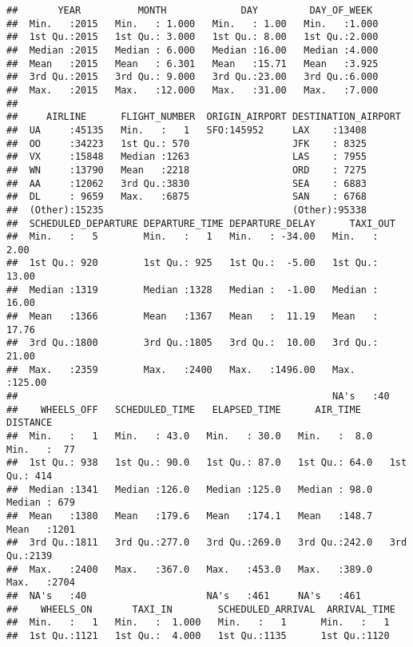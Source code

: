 \documentclass[
]{article}
\begin{document}
\begin{verbatim}
##       YEAR          MONTH             DAY         DAY_OF_WEEK   
##  Min.   :2015   Min.   : 1.000   Min.   : 1.00   Min.   :1.000  
##  1st Qu.:2015   1st Qu.: 3.000   1st Qu.: 8.00   1st Qu.:2.000  
##  Median :2015   Median : 6.000   Median :16.00   Median :4.000  
##  Mean   :2015   Mean   : 6.301   Mean   :15.71   Mean   :3.925  
##  3rd Qu.:2015   3rd Qu.: 9.000   3rd Qu.:23.00   3rd Qu.:6.000  
##  Max.   :2015   Max.   :12.000   Max.   :31.00   Max.   :7.000  
##                                                                 
##     AIRLINE      FLIGHT_NUMBER  ORIGIN_AIRPORT DESTINATION_AIRPORT
##  UA     :45135   Min.   :   1   SFO:145952     LAX    :13408      
##  OO     :34223   1st Qu.: 570                  JFK    : 8325      
##  VX     :15848   Median :1263                  LAS    : 7955      
##  WN     :13790   Mean   :2218                  ORD    : 7275      
##  AA     :12062   3rd Qu.:3830                  SEA    : 6883      
##  DL     : 9659   Max.   :6875                  SAN    : 6768      
##  (Other):15235                                 (Other):95338      
##  SCHEDULED_DEPARTURE DEPARTURE_TIME DEPARTURE_DELAY      TAXI_OUT     
##  Min.   :   5        Min.   :   1   Min.   : -34.00   Min.   :  2.00  
##  1st Qu.: 920        1st Qu.: 925   1st Qu.:  -5.00   1st Qu.: 13.00  
##  Median :1319        Median :1328   Median :  -1.00   Median : 16.00  
##  Mean   :1366        Mean   :1367   Mean   :  11.19   Mean   : 17.76  
##  3rd Qu.:1800        3rd Qu.:1805   3rd Qu.:  10.00   3rd Qu.: 21.00  
##  Max.   :2359        Max.   :2400   Max.   :1496.00   Max.   :125.00  
##                                                       NA's   :40      
##    WHEELS_OFF   SCHEDULED_TIME   ELAPSED_TIME      AIR_TIME        DISTANCE   
##  Min.   :   1   Min.   : 43.0   Min.   : 30.0   Min.   :  8.0   Min.   :  77  
##  1st Qu.: 938   1st Qu.: 90.0   1st Qu.: 87.0   1st Qu.: 64.0   1st Qu.: 414  
##  Median :1341   Median :126.0   Median :125.0   Median : 98.0   Median : 679  
##  Mean   :1380   Mean   :179.6   Mean   :174.1   Mean   :148.7   Mean   :1201  
##  3rd Qu.:1811   3rd Qu.:277.0   3rd Qu.:269.0   3rd Qu.:242.0   3rd Qu.:2139  
##  Max.   :2400   Max.   :367.0   Max.   :453.0   Max.   :389.0   Max.   :2704  
##  NA's   :40                     NA's   :461     NA's   :461                   
##    WHEELS_ON       TAXI_IN        SCHEDULED_ARRIVAL  ARRIVAL_TIME 
##  Min.   :   1   Min.   :  1.000   Min.   :   1      Min.   :   1  
##  1st Qu.:1121   1st Qu.:  4.000   1st Qu.:1135      1st Qu.:1120  

\end{verbatim}
\end{document}

